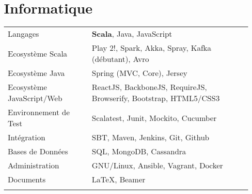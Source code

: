 \documentclass[11pt,a4paper]{moderncv}
\begin{document}
\section{Informatique}
\begin{tabular}{ll}
  \vspace{0.1cm}
  \hspace{0.1cm} Langages & \hspace{0.5cm} \textbf{Scala}, Java, JavaScript \\ \vspace{0.1cm}
  \hspace{0.1cm} Ecosystème Scala & \hspace{0.5cm} Play 2!, Spark, Akka, Spray, Kafka (débutant), Avro \\ \vspace{0.1cm}
  \hspace{0.1cm} Ecosystème Java & \hspace{0.5cm} Spring (MVC, Core), Jersey \\ \vspace{0.1cm}
  \hspace{0.1cm} Ecosystème JavaScript/Web & \hspace{0.5cm} ReactJS, BackboneJS, RequireJS, Browserify, Bootstrap, HTML5/CSS3 \\ \vspace{0.1cm}
  \hspace{0.1cm} Environnement de Test & \hspace{0.5cm} Scalatest, Junit, Mockito, Cucumber \\ \vspace{0.1cm}
  \hspace{0.1cm} Intégration & \hspace{0.5cm} SBT, Maven, Jenkins, Git, Github \\ \vspace{0.1cm}
  \hspace{0.1cm} Bases de Données & \hspace{0.5cm} SQL, MongoDB, Cassandra \\ \vspace{0.1cm}
  \hspace{0.1cm} Administration & \hspace{0.5cm} GNU/Linux, Ansible, Vagrant, Docker \\ \vspace{0.1cm}
  \hspace{0.1cm} Documents & \hspace{0.5cm} \LaTeX, Beamer \\ \vspace{0.1cm}
\end{tabular}
\end{document}
